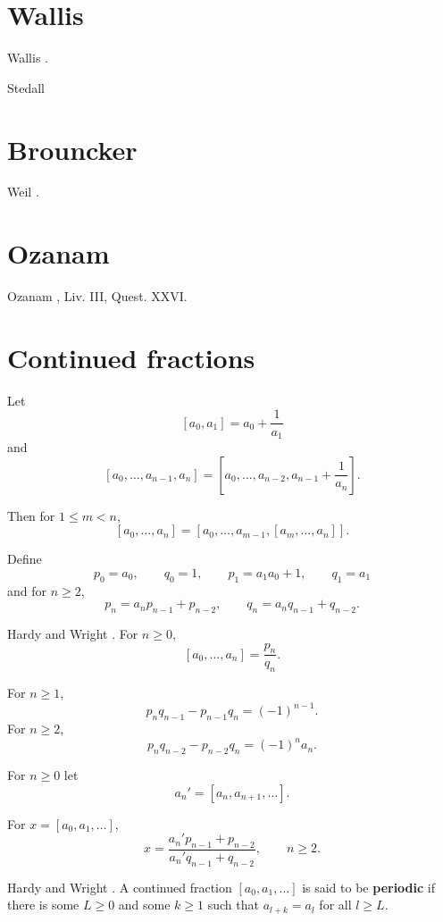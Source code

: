 \documentclass{article}
\theoremstyle{definition}
\begin{document}
\section{Wallis}
Wallis \cite[p.~546]{wallisII}.

Stedall \cite{stedall}



\section{Brouncker}
Weil \cite[pp.~92--99]{weil}.






\section{Ozanam}
Ozanam \cite[pp.~503--516]{ozanam}, Liv. III, Quest. XXVI.



\section{Continued fractions}
Let
\[
[a_0,a_1] = a_0 + \frac{1}{a_1}
\]
and
\[
[a_0,\ldots,a_{n-1},a_n] = \left[a_0,\ldots,a_{n-2},a_{n-1}+\frac{1}{a_n}\right].
\]

Then for $1 \leq m < n$,
\[
[a_0,\ldots,a_n] = [a_0,\ldots,a_{m-1},[a_m,\ldots,a_n]].
\]

Define
\[
p_0=a_0,\qquad q_0=1,
\qquad p_1=a_1a_0+1,\qquad q_1=a_1
\]
and for $n \geq 2$,
\[
p_n=a_np_{n-1}+p_{n-2},\qquad q_n=a_nq_{n-1}+q_{n-2}.
\]

Hardy and Wright \cite[p.~130, Theorem 149]{HW}. For $n \geq 0$,
\[
[a_0,\ldots,a_n] = \frac{p_n}{q_n}.
\]

For $n \geq 1$,
\[
p_n q_{n-1} - p_{n-1}q_n = (-1)^{n-1}.
\]
For $n \geq 2$,
\[
p_nq_{n-2} - p_{n-2}q_n = (-1)^n a_n.
\]

For $n \geq 0$ let
\[
a_n' = [a_n,a_{n+1},\ldots].
\]

For $x = [a_0,a_1,\ldots]$,
\[
x = \frac{a_n'p_{n-1}+p_{n-2}}{a_n'q_{n-1}+q_{n-2}},\qquad n \geq 2.
\]

Hardy and Wright \cite[p.~144, Theorem 176]{HW}.
A continued fraction $[a_0,a_1,\ldots]$ is said to be \textbf{periodic} if there is some
$L \geq 0$ and some $k \geq 1$ such that 
$a_{l+k}=a_l$ for all $l \geq L$.
\end{document}
